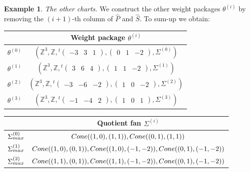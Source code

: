 \documentclass[11pt, reqno]{amsart}
\theoremstyle{plain}
\theoremstyle{definition}
\newtheorem{example}[theorem]{Example}
\theoremstyle{remark}
\begin{document}
\begin{example}
\emph{The other charts.} We construct the other weight packages $\theta^{(i)}$ by removing
the $(i+1)$-th column of $\widehat{P}$ and $\widehat{S}$.
To sum-up we obtain:
\begin{center}
 \begin{tabular}{|c| c |} 
 \hline
  &  Weight package $\theta^{(i)}$ \\ [1ex] 
 \hline\hline
 $\theta^{(0)}$ & $\left(\mathbb{Z}^{3}, \mathbb{Z}, {}^{t}\begin{pmatrix}
 -3 & 3 & 1
\end{pmatrix},  \begin{pmatrix} 0  & 1 & -2
\end{pmatrix}, \Sigma^{(0)}\right)$ \\ [2ex] 
 \hline
  $\theta^{(1)}$ & $\left(\mathbb{Z}^{3}, \mathbb{Z}, {}^{t}\begin{pmatrix}
3 & 6 & 4
\end{pmatrix},  \begin{pmatrix} 1  & 1 & -2
\end{pmatrix}, \Sigma^{(1)}\right)$  \\  [2ex] 
 \hline
  $\theta^{(2)}$ & $\left(\mathbb{Z}^{3}, \mathbb{Z}, {}^{t}\begin{pmatrix}
 -3 & -6 & -2
\end{pmatrix},  \begin{pmatrix} 1  & 0 & -2
\end{pmatrix}, \Sigma^{(2)}\right)$  \\ [2ex] 
 \hline
  $\theta^{(3)}$ &$\left(\mathbb{Z}^{3}, \mathbb{Z}, {}^{t}\begin{pmatrix}
 -1 & -4 & 2
\end{pmatrix},  \begin{pmatrix} 1  & 0 & 1
\end{pmatrix}, \Sigma^{(3)}\right)$  \\ [2ex] 
 \hline
\end{tabular}
\end{center}
\begin{center}
 \begin{tabular}{|c| c |} 
 \hline
  &  Quotient fan $\Sigma^{(i)}$ \\ [1ex] 
 \hline\hline
 $\Sigma^{(0)}_{\rm max}$ &  ${\rm Cone}((1,0), (1,1)),{\rm Cone}((0,1),(1,1))$ \\ [2ex] 
 \hline
  $\Sigma^{(1)}_{\rm max}$ & ${\rm Cone}((1,0),(0,1)), {\rm Cone}((1,0),(-1,-2)), {\rm Cone}((0,1),(-1,-2))$  \\  [2ex] 
 \hline
  $\Sigma^{(2)}_{\rm max}$ & ${\rm Cone}((1,1), (0,1)), {\rm Cone}((1,1),(-1,-2)), {\rm Cone}((0,1),(-1,-2))$  \\ [2ex] 

\end{tabular}
\end{center}
\end{example}
\end{document}
